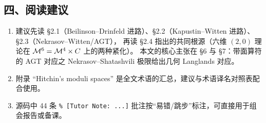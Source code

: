 \subsection*{四、阅读建议}

\begin{enumerate}[label=（\arabic*）,leftmargin=*]
  \item 建议先读 §2.1（Beilinson--Drinfeld 进路）、§2.2（Kapustin--Witten 进路）、§2.3（Nekrasov--Witten/AGT），
        再读 §2.4 指出的共同根源（六维 $(2,0)$ 理论在 $\mathcal{M}^6=\mathcal{M}^4\times C$ 上的两种紧化）。
        本文的核心主张在 §6 与 §7：带面算符的 AGT 对应之 Nekrasov--Shatashvili 极限给出几何 Langlands 对应。
  \item 附录 “Hitchin's moduli spaces” 是全文术语的汇总，建议与术语译名对照表配合使用。
  \item 源码中 44 条 \verb|% [Tutor Note: ...]| 批注按“易错/跳步”标注，可直接用于组会报告或备课。
\end{enumerate}
